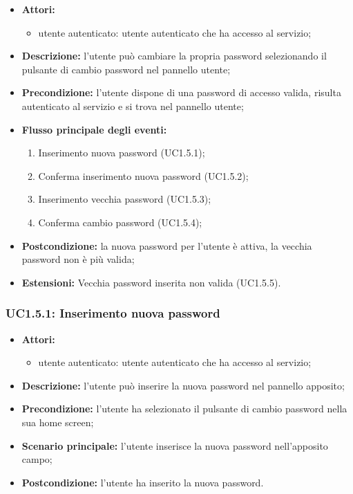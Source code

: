 \begin{itemize}
	\item \textbf{Attori:}
	\begin{itemize}
		\item utente autenticato: utente autenticato che ha accesso al servizio;
	\end{itemize}
	\item \textbf{Descrizione:} l'utente può cambiare la propria password selezionando il pulsante di cambio password nel pannello utente;
	\item \textbf{Precondizione:} l'utente dispone di una password di accesso valida, risulta autenticato al servizio e si trova nel pannello utente;
	\item \textbf{Flusso principale degli eventi:}
	\begin{enumerate}
		\item Inserimento nuova password (UC1.5.1);
		\item Conferma inserimento nuova password (UC1.5.2);
		\item Inserimento vecchia password (UC1.5.3);
		\item Conferma cambio password (UC1.5.4);
	\end{enumerate}
	\item \textbf{Postcondizione:} la nuova password per l'utente è attiva, la vecchia password non è più valida;
	\item \textbf{Estensioni:} Vecchia password inserita non valida (UC1.5.5).
\end{itemize}

\subsubsection{UC1.5.1: Inserimento nuova password}
\begin{itemize}
	\item \textbf{Attori:}
	\begin{itemize}
		\item utente autenticato: utente autenticato che ha accesso al servizio;
	\end{itemize}
	\item \textbf{Descrizione:} l'utente può inserire la nuova password nel pannello apposito;
	\item \textbf{Precondizione:} l'utente ha selezionato il pulsante di cambio password nella sua home screen;
	\item \textbf{Scenario principale:} l'utente inserisce la nuova password nell'apposito campo;
	\item \textbf{Postcondizione:} l'utente ha inserito la nuova password.
\end{itemize}

